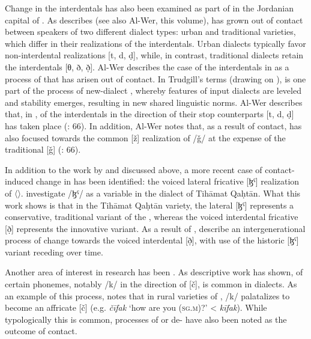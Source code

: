 \documentclass[output=paper]{langsci/langscibook}
\begin{document}
  Change in the interdentals has also been examined as part of   in the Jordanian capital of . As \citet{Al-Wer2007} describes (see also Al-Wer, this volume),   has grown out of contact between speakers of two different dialect types: urban  and traditional  varieties, which differ in their realizations of the interdentals. Urban  dialects typically favor non-interdental realizations [t, d, ḍ], while, in contrast, traditional  dialects retain the interdentals [θ, ð, ð̣]. Al-Wer describes the case of the interdentals in  as a process of  \citep{Trudgill2004} that has arisen out of contact. In Trudgill’s terms (drawing on \citealt{LePageTabouret-Keller1985}),  is one part of the process of new-dialect , whereby features of input dialects are leveled and stability emerges, resulting in new shared linguistic norms. Al-Wer describes that, in ,  of the interdentals in the direction of their stop counterparts [t, d, ḍ] has taken place (\citealt{Al-Wer2007}: 66). In addition, Al-Wer notes that, as a result of contact,   has also focused towards the common  [ž] realization of /ǧ/ at the expense of the traditional  [ǧ] (\citealt{Al-Wer2007}: 66).  

  In addition to the work by \citet{Al-Essa2008} and \citet{Alghamdi2014} discussed above, a more recent case of contact-induced change in  has been identified: the voiced lateral fricative [ɮˤ] realization of 〈〉. \citet{Al-WerAl-Qahtani2016} investigate /ɮˤ/ as a variable in the dialect of Tihāmat Qaḥtān. What this work shows is that in the Tihāmat Qaḥtān variety, the lateral [ɮˤ] represents a conservative, traditional variant of the , whereas the voiced interdental fricative [ð̣] represents the innovative variant. As a result of , \citet{Al-WerAl-Qahtani2016} describe an intergenerational process of change towards the voiced  interdental [ð̣], with use of the historic [ɮˤ] variant receding over time.

  Another area of interest in  research has been . As descriptive work has shown,  of certain phonemes, notably /k/ in the direction of [č], is common in  dialects. As an example of this process, \citet{Shahin2011} notes that in rural varieties of  , /k/ palatalizes to become an affricate [č] (e.g. \textit{čīfak} ‘how are you (\textsc{sg.m})?’ < \textit{kīfak}). While typologically this  is common, processes of  or de- have also been noted as the outcome of contact. 
\end{document}
